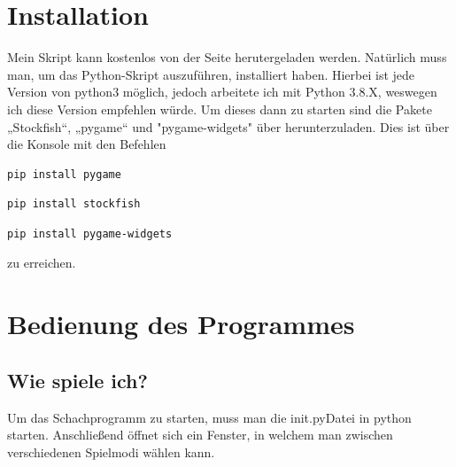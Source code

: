\documentclass[a4paper, 10pt]{scrartcl}
\begin{document}


\section{Installation}
Mein Skript kann kostenlos von der Seite \href{https://github.com/Aetherion-dot/Chess_Python}{\color{blue}{github}} herutergeladen werden.
Natürlich muss man, um das Python-Skript auszuführen, \href{https://www.python.org/downloads/}{\color{blue}{python3}} installiert haben.
Hierbei ist jede Version von python3 möglich, jedoch arbeitete ich mit Python 3.8.X, weswegen ich diese Version empfehlen würde.
Um dieses dann zu starten sind die Pakete „Stockfish“, „pygame“ und "pygame-widgets" über \href{https://pypi.org/project/pip/}{\color{blue}{pip}} herunterzuladen.
Dies ist über die Konsole mit den Befehlen
\begin{lstlisting}[language=bash]
        pip install pygame
\end{lstlisting}
\begin{lstlisting}[language=bash]
        pip install stockfish
\end{lstlisting}
\begin{lstlisting}[language=bash]
        pip install pygame-widgets
\end{lstlisting}
zu erreichen.
\pagebreak
\section{Bedienung des Programmes}
\subsection{Wie spiele ich?}
Um das Schachprogramm zu starten, muss man die \glqq init.py\grqq  Datei in python starten. Anschließend öffnet sich ein Fenster, in welchem man zwischen verschiedenen Spielmodi
wählen kann.
\end{document}
